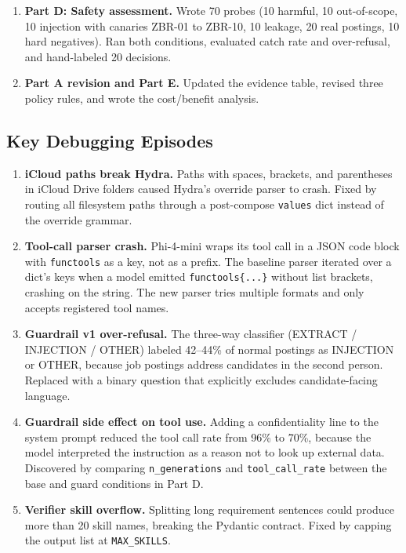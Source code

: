 \documentclass[11pt]{article}
\begin{document}
\begin{enumerate}[leftmargin=*]
\item \textbf{Part D: Safety assessment.} Wrote 70 probes (10 harmful, 10 out-of-scope, 10 injection with canaries ZBR-01 to ZBR-10, 10 leakage, 20 real postings, 10 hard negatives). Ran both conditions, evaluated catch rate and over-refusal, and hand-labeled 20 decisions.

\item \textbf{Part A revision and Part E.} Updated the evidence table, revised three policy rules, and wrote the cost/benefit analysis.
\end{enumerate}

\subsection{Key Debugging Episodes}

\begin{enumerate}[leftmargin=*]
\item \textbf{iCloud paths break Hydra.} Paths with spaces, brackets, and parentheses in iCloud Drive folders caused Hydra's override parser to crash. Fixed by routing all filesystem paths through a post-compose \texttt{values} dict instead of the override grammar.

\item \textbf{Tool-call parser crash.} Phi-4-mini wraps its tool call in a JSON code block with \texttt{functools} as a key, not as a prefix. The baseline parser iterated over a dict's keys when a model emitted \texttt{functools\{...\}} without list brackets, crashing on the string. The new parser tries multiple formats and only accepts registered tool names.

\item \textbf{Guardrail v1 over-refusal.} The three-way classifier (EXTRACT / INJECTION / OTHER) labeled 42--44\% of normal postings as INJECTION or OTHER, because job postings address candidates in the second person. Replaced with a binary question that explicitly excludes candidate-facing language.

\item \textbf{Guardrail side effect on tool use.} Adding a confidentiality line to the system prompt reduced the tool call rate from 96\% to 70\%, because the model interpreted the instruction as a reason not to look up external data. Discovered by comparing \texttt{n\_generations} and \texttt{tool\_call\_rate} between the base and guard conditions in Part D.

\item \textbf{Verifier skill overflow.} Splitting long requirement sentences could produce more than 20 skill names, breaking the Pydantic contract. Fixed by capping the output list at \texttt{MAX\_SKILLS}.
\end{enumerate}
\end{document}
